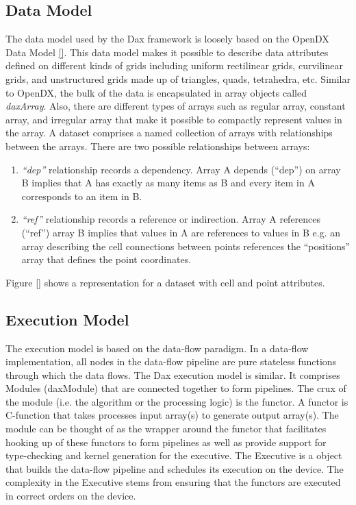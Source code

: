 \documentclass{vgtc}                          %
\begin{document}
\subsection{Data Model}
\label{sec:DataModel}

The data model used by the Dax framework is loosely based on the OpenDX Data Model
\ref{}. This data model makes it possible to describe data attributes defined on
different kinds of grids including uniform rectilinear grids, curvilinear grids,
and unstructured grids made up of triangles, quads, tetrahedra, etc. Similar
to OpenDX, the bulk of the data is encapsulated in array objects called
\emph{daxArray}. Also, there are different types of arrays such as
regular array, constant array, and irregular array that make it possible to
compactly represent values in the array. A dataset comprises a named
collection of arrays with relationships between the arrays. There are two
possible relationships between arrays:
\begin{enumerate}
\item \emph{``dep''} relationship records a dependency. Array A depends (``dep'') on
array B implies that A has exactly as many items as B and every item in A
corresponds to an item in B.
\item \emph{``ref''} relationship records a reference or indirection. Array A
references (``ref'') array B implies that values in A are references to values in
B e.g. an array describing the cell connections between points references the
``positions'' array that defines the point coordinates.
\end{enumerate}

Figure \ref{} shows a representation for a dataset with cell and point
attributes.

\subsection{Execution Model}
\label{sec:ExecutionModel}

The execution model is based on the data-flow paradigm. In a data-flow
implementation, all nodes in the data-flow pipeline are pure stateless functions
through which the data flows. The Dax execution model is similar. It comprises
Modules (daxModule) that are connected together to form pipelines. The crux of
the module (i.e. the algorithm or the processing logic) is the functor. A
functor is C-function that takes processes input array(s) to generate output
array(s). The module can be thought of as the wrapper around the functor that
facilitates hooking up of these functors to form pipelines as well as provide
support for type-checking and kernel generation for the executive. The Executive
is a object that builds the data-flow pipeline and schedules its execution on
the device. The complexity in the Executive stems from ensuring that the
functors are executed in correct orders on the device.
\end{document}
